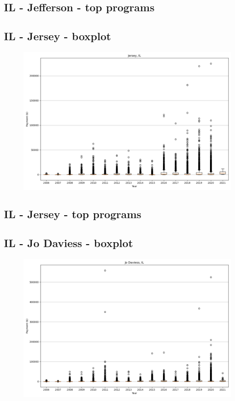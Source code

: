 \subsection*{IL - Jefferson - top programs}

\newpage
\subsection*{IL - Jersey - boxplot}
\begin{figure}[h]
\centering
\includegraphics[width=7in]{../output/boxplots/counties/Jersey-IL_boxplot.png}
\end{figure}


\subsection*{IL - Jersey - top programs}

\newpage
\subsection*{IL - Jo Daviess - boxplot}
\begin{figure}[h]
\centering
\includegraphics[width=7in]{../output/boxplots/counties/Jo Daviess-IL_boxplot.png}
\end{figure}


